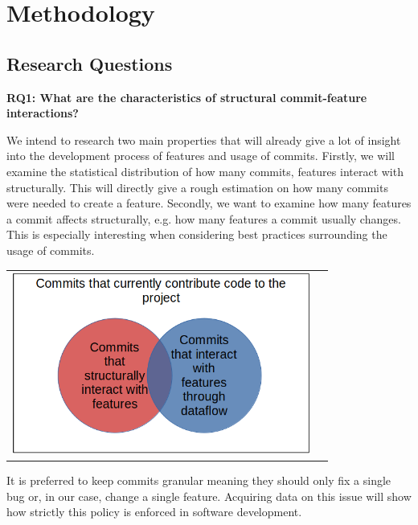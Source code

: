 \section*{Methodology}\label{ch:methodology}

\subsection*{Research Questions}\label{sec:research_questions}

\textbf{RQ1: What are the characteristics of structural commit-feature interactions?}

We intend to research two main properties that will already give a lot of insight into the development process of features and usage of commits.
Firstly, we will examine the statistical distribution of how many commits, features interact with structurally.
This will directly give a rough estimation on how many commits were needed to create a feature.
Secondly, we want to examine how many features a commit affects structurally, e.g. how many features a commit usually changes. 
This is especially interesting when considering best practices surrounding the usage of commits.

\begin{center}
\begin{tabular}{cc}
\includegraphics[height=6cm]{gfx/Commits-of-a-Software-Project.png}
\end{tabular}
\end{center}

It is preferred to keep commits granular meaning they should only fix a single bug or, in our case, change a single feature.
Acquiring data on this issue will show how strictly this policy is enforced in software development. \\

